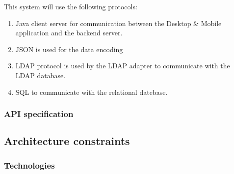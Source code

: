 \documentclass[letterpaper]{article}
\begin{document}
			This system will use the following protocols:
			\begin{enumerate}
				\item Java client server for communication between the Desktop \& Mobile application and the backend server. 
				\item JSON is used for the data encoding 
				\item LDAP protocol is used by the LDAP adapter to communicate with the LDAP database.
				\item SQL to communicate with the relational datebase.
			\end{enumerate}
		
			\vspace{0.2in}
			\subsubsection*{API specification}
			\vspace{0.1in}
		
		
		\vspace{0.2in}
		
		\subsection*{Architecture constraints}
		
		\vspace{0.1in}
		
		\subsubsection*{Technologies}
			\vspace{0.1in}
			
\end{document}
